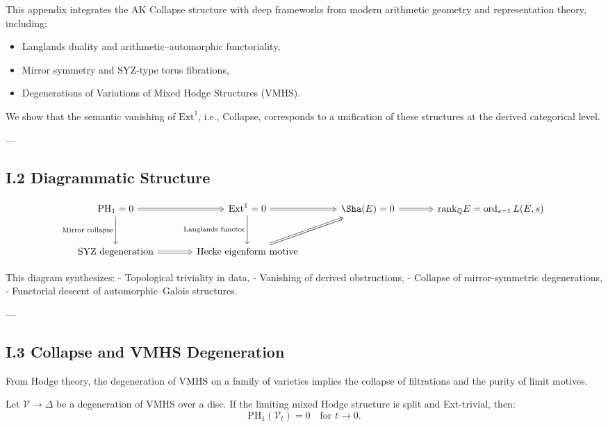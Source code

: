 This appendix integrates the AK Collapse structure  
with deep frameworks from modern arithmetic geometry and representation theory, including:

\begin{itemize}
  \item Langlands duality and arithmetic–automorphic functoriality,
  \item Mirror symmetry and SYZ-type torus fibrations,
  \item Degenerations of Variations of Mixed Hodge Structures (VMHS).
\end{itemize}

We show that the semantic vanishing of \( \mathrm{Ext}^1 \), i.e., Collapse,  
corresponds to a unification of these structures at the derived categorical level.

---

\subsection*{I.2 Diagrammatic Structure}

\[
\begin{tikzcd}[row sep=large, column sep=large]
\mathrm{PH}_1 = 0 \arrow[r, Rightarrow] \arrow[d, "\text{Mirror collapse}"'] &
\mathrm{Ext}^1 = 0 \arrow[r, Rightarrow] \arrow[d, "\text{Langlands functor}"'] &
\Sha(E) = 0 \arrow[r, Rightarrow] &
\mathrm{rank}_{\mathbb{Q}} E = \operatorname{ord}_{s=1} L(E,s) \\
\text{SYZ degeneration} \arrow[r, Rightarrow] &
\text{Hecke eigenform motive} \arrow[ur, Rightarrow] &
\end{tikzcd}
\]

This diagram synthesizes:
- Topological triviality in data,
- Vanishing of derived obstructions,
- Collapse of mirror-symmetric degenerations,
- Functorial descent of automorphic–Galois structures.

---

\subsection*{I.3 Collapse and VMHS Degeneration}

From Hodge theory, the degeneration of VMHS on a family of varieties  
implies the collapse of filtrations and the purity of limit motives.

\begin{proposition}
Let \( \mathcal{V} \to \Delta \) be a degeneration of VMHS over a disc.  
If the limiting mixed Hodge structure is split and Ext-trivial, then:
\[
\mathrm{PH}_1(\mathcal{V}_t) = 0 \quad \text{for } t \to 0.
\]
\end{proposition}

